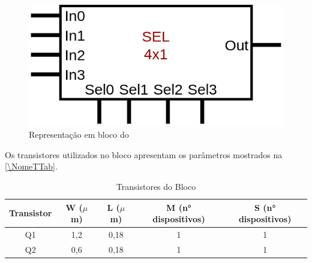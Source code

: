 \begin{figure}[htb]
 \label{NomeSFig}
 \centering
    \centering
    \caption{Representa{\c c}\~ao em bloco do \NomeBloco} \label{NomeSFig}
    \includegraphics[scale=0.3]{Circuitos/sel4x1_block.png}
\end{figure}

Os transistores utilizados no bloco \NomeBloco{} apresentam os par\^ametros mostrados na \autoref{\NomeTTab}.

\begin{table}[htbp]
\caption{Transistores do Bloco \NomeBloco}
\label{\NomeTTab}
\centering
\begin{tabular}{ccccc}
\toprule
Transistor & W ($\mu$m)  & L ($\mu$m)           & M (n° dispositivos) & S (n° dispositivos)\\
\midrule \midrule
Q1 & 1,2 & 0,18 & 1 & 1\\
\midrule
Q2 & 0,6 & 0,18 & 1 & 1\\
\bottomrule
\end{tabular}
\end{table}